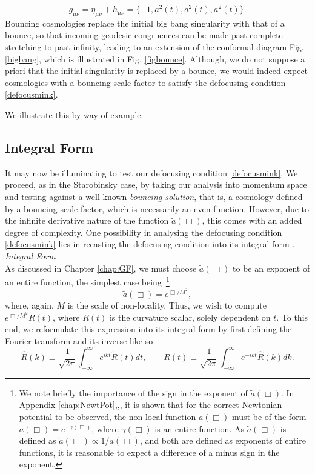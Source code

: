 \[
g_{\mu\nu}=\eta_{\mu\nu}+h_{\mu\nu}=\{-1,a^2(t),a^2(t),a^2(t)\}
.\]
Bouncing cosmologies replace the initial big bang singularity with that of a bounce, so that incoming geodesic congruences can be made past complete - stretching to past infinity, leading to an extension of the conformal diagram Fig. \ref{bigbang}, which is illustrated in Fig. \ref{figbounce}. Although, we do not suppose a priori that the initial singularity is replaced by a bounce, we would indeed expect cosmologies with a bouncing scale factor to satisfy the defocusing condition \eqref{defocusmink}. 

\noindent We illustrate this by way of example.
\subsection{Integral Form}
It may now be illuminating to test our defocusing condition \eqref{defocusmink}. We proceed, as in the Starobinsky case, by taking our analysis into momentum space and testing against a well-known \emph{bouncing solution}, that is, a cosmology defined by a bouncing scale factor, which is necessarily an even function. However, due to the infinite derivative nature of the function ${\tilde a}(\Box)$, this comes with an added degree of complexity. One possibility in analysing the defocusing condition \eqref{defocusmink}  lies in recasting the defocusing condition into its integral form \cite{reed1975methods}.
\newpage
\noindent\emph{Integral Form}\\
As discussed in Chapter \ref{chap:GF}, we must choose ${\tilde a}(\Box)$ to be an exponent of an entire function, the simplest case being~\footnote{We note briefly the importance of the sign in the exponent of ${\tilde a}(\Box)$. In Appendix \ref{chap:NewtPot},\cite{Edholm:2016hbt},\cite{Biswas:2011ar}, it is shown that for the correct Newtonian potential to be observed, the non-local function $a(\Box)$ must be of the form $a(\Box)=e^{-\gamma(\Box)}$, where $\gamma(\Box)$ is an entire function. As ${\tilde a}(\Box)$ is defined as ${\tilde a}(\Box)\propto 1/a(\Box)$, and both are defined as exponents of entire functions, it is reasonable to expect a difference of a minus sign in the exponent.} 
\[
{\tilde a}(\Box)=e^{\Box/M^2}
,\]
where, again, $M$ is the scale of non-locality. Thus, we wish to compute $e^{\Box/M^2}R(t)$, where $R(t)$ is the curvature scalar, solely dependent on $t$. To this end, we reformulate this expression into its integral form by first defining the Fourier transform and its inverse like so
\[
\hat{R}(k)\equiv\frac{1}{\sqrt{2\pi}}\int_{-\infty}^{\infty}e^{ikt}\tilde{R}(t)dt,\qquad R(t)\equiv\frac{1}{\sqrt{2\pi}}\int_{-\infty}^{\infty}e^{-ikt}\hat{R}(k)dk
.\]
